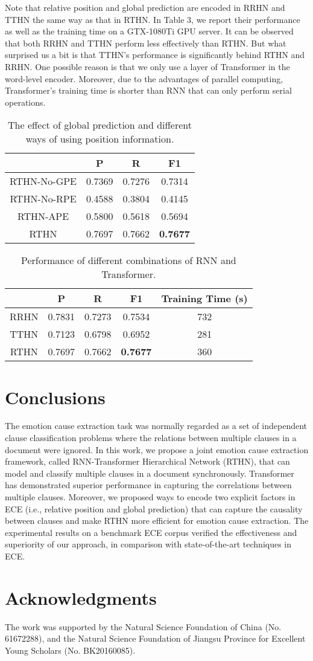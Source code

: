 \documentclass{article}
\begin{document}
Note that relative position and global prediction are encoded in RRHN and TTHN the same way as that in RTHN. In Table 3, we report their performance as well as the training time on a GTX-1080Ti GPU server. It can be observed that both RRHN and TTHN perform less effectively than RTHN. But what surprised us a bit is that TTHN's performance is significantly behind RTHN and RRHN. One possible reason is that we only use a layer of Transformer in the word-level encoder. Moreover, due to the advantages of parallel computing, Transformer's training time is shorter than RNN that can only perform serial operations.
\begin{table}
\centering
\begin{tabular}{c|c|c|c}
\hline
& P & R & F1  \\
\hline
RTHN-No-GPE & 0.7369 & 0.7276 & 0.7314 \\
RTHN-No-RPE & 0.4588 & 0.3804 & 0.4145 \\
RTHN-APE & 0.5800 & 0.5618 & 0.5694 \\
RTHN & 0.7697 & 0.7662 & {\bf 0.7677} \\
\hline
\end{tabular}
\caption{The effect of global prediction and different ways of using position information.}
\label{tab:plain}
\end{table}

\begin{table}
\centering
\begin{tabular}{c|c|c|c|c}
\hline
& P & R & F1 & Training Time (s) \\
\hline
RRHN & 0.7831 & 0.7273 & 0.7534 & 732 \\
TTHN & 0.7123 & 0.6798 & 0.6952 & 281\\
RTHN & 0.7697 & 0.7662 & {\bf 0.7677} & 360\\
\hline
\end{tabular}
\caption{Performance of different combinations of RNN and Transformer.}
\label{tab:plain}
\end{table}
\section{Conclusions}
The emotion cause extraction task was normally regarded as a set of independent clause classification problems where the relations between multiple clauses in a document were ignored. In this work, we propose a joint emotion cause extraction framework, called RNN-Transformer Hierarchical Network (RTHN), that can model and classify multiple clauses in a document synchronously. Transformer has demonstrated superior performance in capturing the correlations between multiple clauses. Moreover, we proposed ways to encode two explicit factors in ECE (i.e., relative position and global prediction) that can capture the causality between clauses and make RTHN more efficient for emotion cause extraction. The experimental results on a benchmark ECE corpus verified the effectiveness and superiority of our approach, in comparison with state-of-the-art techniques in ECE.

\section{Acknowledgments}
The work was supported by the Natural Science Foundation of China (No. 61672288), and the Natural Science Foundation of Jiangsu Province for Excellent Young Scholars (No. BK20160085).


\end{document}
